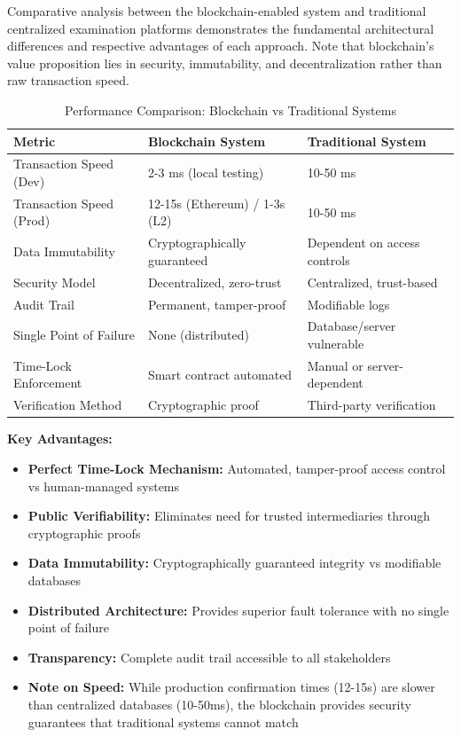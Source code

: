 \documentclass[12pt,a4paper]{article}
\begin{document}
Comparative analysis between the blockchain-enabled system and traditional centralized examination platforms demonstrates the fundamental architectural differences and respective advantages of each approach. Note that blockchain's value proposition lies in security, immutability, and decentralization rather than raw transaction speed.

\begin{table}[H]
\centering
\caption{Performance Comparison: Blockchain vs Traditional Systems}
\label{tab:blockchain-vs-traditional}
\begin{tabular}{p{4.5cm}p{4.5cm}p{4.5cm}}
\toprule
\textbf{Metric} & \textbf{Blockchain System} & \textbf{Traditional System} \\
\midrule
Transaction Speed (Dev) & 2-3 ms (local testing) & 10-50 ms \\
Transaction Speed (Prod) & 12-15s (Ethereum) / 1-3s (L2) & 10-50 ms \\
Data Immutability & Cryptographically guaranteed & Dependent on access controls \\
Security Model & Decentralized, zero-trust & Centralized, trust-based \\
Audit Trail & Permanent, tamper-proof & Modifiable logs \\
Single Point of Failure & None (distributed) & Database/server vulnerable \\
Time-Lock Enforcement & Smart contract automated & Manual or server-dependent \\
Verification Method & Cryptographic proof & Third-party verification \\
\bottomrule
\end{tabular}
\end{table}

\textbf{Key Advantages:}
\begin{itemize}
    \item \textbf{Perfect Time-Lock Mechanism:} Automated, tamper-proof access control vs human-managed systems
    \item \textbf{Public Verifiability:} Eliminates need for trusted intermediaries through cryptographic proofs
    \item \textbf{Data Immutability:} Cryptographically guaranteed integrity vs modifiable databases
    \item \textbf{Distributed Architecture:} Provides superior fault tolerance with no single point of failure
    \item \textbf{Transparency:} Complete audit trail accessible to all stakeholders
    \item \textbf{Note on Speed:} While production confirmation times (12-15s) are slower than centralized databases (10-50ms), the blockchain provides security guarantees that traditional systems cannot match
\end{itemize}
\end{document}
